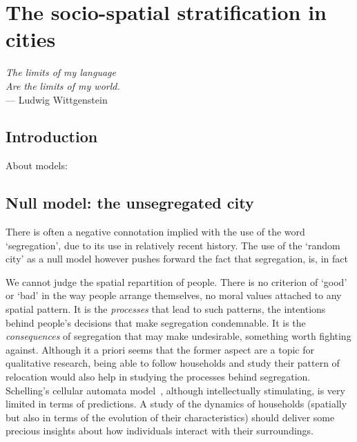 %
\chapter{The socio-spatial stratification in cities}
\label{sec:concepts}


\begin{flushright}{\slshape    
The limits of my language\\
Are the limits of my world.} \\ \medskip
--- Ludwig Wittgenstein 
\end{flushright}

\section{Introduction}
\label{sec:introduction}

About models: \cite{Gauvin:2013, Brueckner:1999, Glaeser:2008}


\section{Null model: the unsegregated city}
\label{sec:null_model_the_unsegregated_city}



There is often a negative connotation implied with the use of the word
`segregation', due to its use in relatively recent history. The use of the
`random city' as a null model however pushes forward the fact that segregation,
is, in fact 

We cannot judge the spatial repartition of people. There is no criterion of
`good' or `bad' in the way people arrange themselves, no moral values attached 
to any spatial pattern. It is the \emph{processes} that lead to such
patterns, the intentions behind people's decisions that make segregation
condemnable. It is the \emph{consequences} of segregation that may make
undesirable, something worth fighting against. Although it a priori seems that
the former aspect are a topic for qualitative research, being able to follow
households and study their pattern of relocation would also help in studying
the processes behind segregation. Schelling's cellular automata
model~\cite{Schelling:1971}, although intellectually stimulating, is very
limited in terms of predictions. A study of the dynamics of households
(spatially but also in terms of the evolution of their characteristics) should
deliver some precious insights about how individuals interact with their
surroundings.


